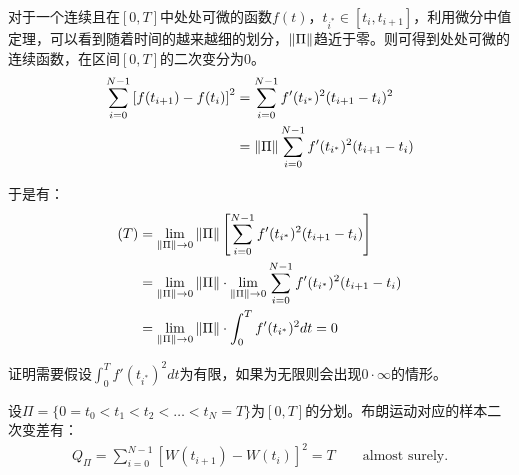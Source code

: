 \documentclass[11pt]{article}
\begin{document}
对于一个连续且在$[0,T]$中处处可微的函数$f(t)$，$t_{i^*} \in [t_{i},t_{i+1}]$，利用微分中值定理，可以看到随着时间的越来越细的划分，$\left\lVert \Pi\right\rVert$趋近于零。则可得到处处可微的连续函数，在区间$[0,T]$的二次变分为0。
\begin{align*}
    \sum_{i=0}^{N-1} \left[ f(t_{i+1}) -f(t_{i}) \right]^2 
    &= \sum_{i=0}^{N-1} f'(t_{i^*})^2 (t_{i+1} - t_{i})^2 \\
    &= \left\lVert \Pi\right\rVert \sum_{i=0}^{N-1} f'(t_{i^*})^2 (t_{i+1} - t_{i})
\end{align*}

于是有：
\begin{align*}
    [f,f](T) &= \lim\limits_{\norm{\Pi} \rightarrow 0} \norm{\Pi} \left[ \sum_{i=0}^{N-1} f'(t_{i^*})^2 (t_{i+1} - t_{i}) \right] \\
    &= \lim\limits_{\norm{\Pi} \rightarrow 0} \norm{\Pi} \cdot \lim\limits_{\norm{\Pi} \rightarrow 0} \sum_{i=0}^{N-1} f'(t_{i^*})^2 (t_{i+1} - t_{i}) \\
    &= \lim\limits_{\norm{\Pi} \rightarrow 0} \norm{\Pi} \cdot \int^T_0 f'(t_{i^*})^2 dt = 0
\end{align*}

证明需要假设$\int^T_0 f'(t_{i^*})^2 dt$为有限，如果为无限则会出现$0\cdot \infty$的情形。

\begin{thm}
    设$\Pi=\{0=t_0<t_1<t_2<\dots<t_N=T\}$为$[0,T]$的分划。布朗运动对应的样本二次变差有：
    \begin{align*}
        Q_{\Pi} = \sum_{i=0}^{N-1} \left[ W(t_{i+1}) - W(t_{i}) \right]^2 = T \qquad \text{almost surely.}
    \end{align*}
\end{thm}
\end{document}
